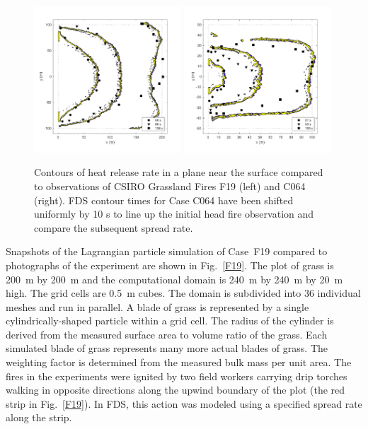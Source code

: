 \documentclass[journal,article,atmosphere,submit,moreauthors,pdftex]{Definitions/mdpi}
\begin{document}
\begin{figure}[ht]
\includegraphics[width=0.49\textwidth]{figures/Case_F19_flame_position.pdf}
\includegraphics[width=0.49\textwidth]{figures/Case_C064_flame_position.pdf}
\caption{Contours of heat release rate in a plane near the surface compared to observations of CSIRO Grassland Fires F19 (left) and C064 (right).  FDS contour times for Case C064 have been shifted uniformly by 10 s to line up the initial head fire observation and compare the subsequent spread rate.}
\label{fig:CaseF19_contours}
\end{figure}

Snapshots of the Lagrangian particle simulation of Case~F19 compared to photographs of the experiment are shown in Fig.~\ref{F19}. The plot of grass is 200~m by 200~m and the computational domain is 240~m by 240~m by 20~m high. The grid cells are 0.5~m cubes. The domain is subdivided into 36 individual meshes and run in parallel. A blade of grass is represented by a single cylindrically-shaped particle within a grid cell. The radius of the cylinder is derived from the measured surface area to volume ratio of the grass. Each simulated blade of grass represents many more actual blades of grass. The weighting factor is determined from the measured bulk mass per unit area. The fires in the experiments were ignited by two field workers carrying drip torches walking in opposite directions along the upwind boundary of the plot (the red strip in Fig.~\ref{F19}). In FDS, this action was modeled using a specified spread rate along the strip.
\end{document}
